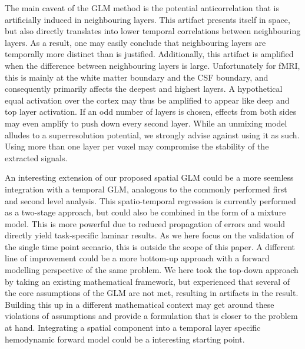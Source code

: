 The main caveat of the GLM method is the potential anticorrelation that is artificially induced in neighbouring layers. This artifact presents itself in space, but also directly translates into lower temporal correlations between neighbouring layers. As a result, one may easily conclude that neighbouring layers are temporally more distinct than is justified. Additionally, this artifact is amplified when the difference between neighbouring layers is large. Unfortunately for fMRI, this is mainly at the white matter boundary and the CSF boundary, and consequently primarily affects the deepest and highest layers. A hypothetical equal activation over the cortex may thus be amplified to appear like deep and top layer activation. If an odd number of layers is chosen, effects from both sides may even amplify to push down every second layer. While an unmixing model alludes to a superresolution potential, we strongly advise against using it as such. Using more than one layer per voxel may compromise the stability of the extracted signals.

An interesting extension of our proposed spatial GLM could be a more seemless integration with a temporal GLM, analogous to the commonly performed first and second level analysis. This spatio-temporal regression is currently performed as a two-stage approach, but could also be combined in the form of a mixture model. This is more powerful due to reduced propagation of errors \cite{Beckmann2003} and would directly yield task-specific laminar results. As we here focus on the validation of the single time point scenario, this is outside the scope of this paper. A different line of improvement could be a more bottom-up approach with a forward modelling perspective of the same problem. We here took the top-down approach by taking an existing mathematical framework, but experienced that several of the core assumptions of the GLM are not met, resulting in artifacts in the result. Building this up in a different mathematical context may get around these violations of assumptions and provide a formulation that is closer to the problem at hand. Integrating a spatial component into a temporal layer specific hemodynamic forward model \cite{Heinzle2016} could be a interesting starting point.

